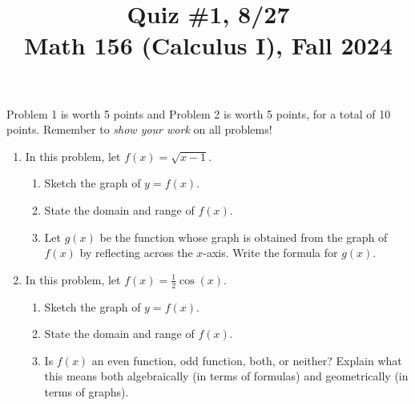 \documentclass[11pt]{article}
\title{Quiz \#1, 8/27 \\ Math 156 (Calculus I), Fall 2024}
\date{}
\begin{document}
\maketitle

\thispagestyle{empty}

\vspace{-1cm}

Problem 1 is worth 5 points and Problem 2 is worth 5 points, for a total of 10 points. Remember to \emph{show your work} on all problems!

\begin{enumerate}
\item In this problem, let $f(x) = \sqrt{x-1}$.
\begin{enumerate}
\item Sketch the graph of $y=f(x)$.
\item State the domain and range of $f(x)$.
\item Let $g(x)$ be the function whose graph is obtained from the graph of $f(x)$ by reflecting across the $x$-axis. Write the formula for $g(x)$.
\end{enumerate}

\vspace{5cm}

\item In this problem, let $f(x) = \frac{1}{2}\cos(x)$.
\begin{enumerate}
\item Sketch the graph of $y=f(x)$.
\item State the domain and range of $f(x)$.
\item Is $f(x)$ an even function, odd function, both, or neither? Explain what this means both algebraically (in terms of formulas) and geometrically (in terms of graphs).
\end{enumerate}

\end{enumerate}
\end{document}
